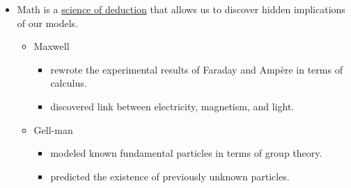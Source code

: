 \begin{remark}
\begin{itemize}
\item Math is a \underline{science of deduction} that allows us to discover hidden implications of our models.
 \begin{itemize}
 \item Maxwell
 \begin{itemize}
 \item rewrote the experimental results of Faraday and Amp\`ere in terms of calculus.
 \item discovered link between electricity, magnetism, and light.
 \end{itemize}
 \item Gell-man
 \begin{itemize}
 \item modeled known fundamental particles in terms of group theory.
 \item predicted the existence of previously unknown particles.
 \end{itemize}
 \end{itemize}
\vfill
\end{itemize}
\end{remark}

\vfill

\newpage

